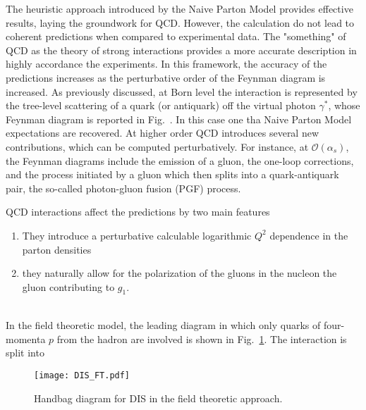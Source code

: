 The heuristic approach introduced by the Naive Parton Model provides effective results, laying the groundwork for QCD. However, the calculation do not lead to coherent predictions when compared to experimental data. The "something" of QCD as the theory of strong interactions provides a more accurate description in highly accordance the experiments. In this framework, the accuracy of the predictions increases as the perturbative order of the Feynman diagram is increased. As previously discussed, at Born level the interaction is represented by the tree-level scattering of a quark (or antiquark) off the virtual photon $\gamma^{*}$, whose Feynman diagram is reported in Fig.~. In this case one tha Naive Parton Model expectations are recovered. At higher order QCD introduces several new contributions, which can be computed perturbatively. For instance, at $\mathcal{O}(\alpha_{s})$, the Feynman diagrams include the emission of a gluon, the one-loop corrections, and the process initiated by a gluon which then splits into a quark-antiquark pair, the so-called photon-gluon fusion (PGF) process.\par
QCD interactions affect the predictions by two main features
\begin{enumerate}
  \item They introduce a perturbative calculable logarithmic $Q^2$ dependence in the parton densities
  \item they naturally allow for the polarization of the gluons in the nucleon the gluon contributing to $g_1$.  
\end{enumerate}
\\
In the field theoretic model, the leading diagram in which only quarks of four-momenta $p$ from the hadron are involved is shown in Fig.~\ref{fig:DIS_FT}. The interaction is split into 

\begin{figure}[h]
  \centering
  \texttt{[image: DIS\_FT.pdf]} 
  \caption{Handbag diagram for DIS in the field theoretic approach.}
  \label{fig:DIS_FT}
\end{figure}

